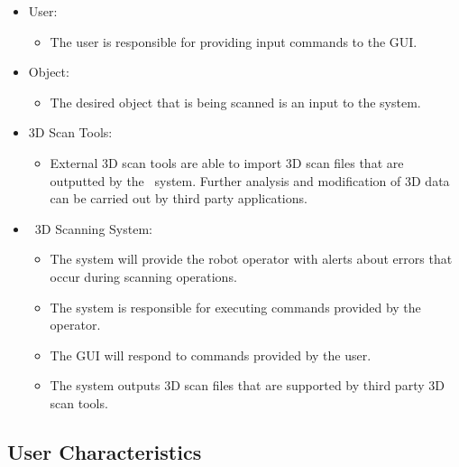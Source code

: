 \documentclass[12pt]{article}
\begin{document}
\begin{itemize}
\item User: 
\begin{itemize}
\item The user is responsible for providing input commands to the GUI. 
\end{itemize}
\end{itemize}

\begin{itemize}
\item Object:
\begin{itemize}
\item The desired object that is being scanned is an input to the system.
\end{itemize}
\end{itemize}

\begin{itemize}
\item 3D Scan Tools:
\begin{itemize}
\item External 3D scan tools are able to import 3D scan files that are outputted by the \progname\ system. Further analysis and modification of 3D data can be carried out by third party applications.
\end{itemize}
\end{itemize}

\begin{itemize}
\item \progname\ 3D Scanning System:
\begin{itemize}
\item The system will provide the robot operator with alerts about errors that occur during scanning operations.
\item The system is responsible for executing commands provided by the operator.
\item The GUI will respond to commands provided by the user.
\item The system outputs 3D scan files that are supported by third party 3D scan tools.
\end{itemize}
\end{itemize}

\subsection{User Characteristics} \label{SecUserCharacteristics}

  
\end{document}
